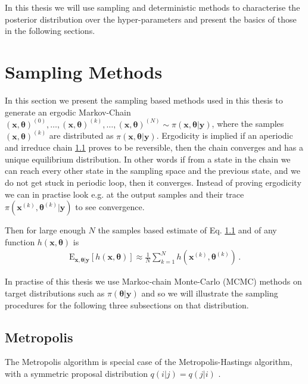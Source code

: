 In this thesis we will use sampling and deterministic methods to characterise the posterior distribution over the hyper-parameters and present the basics of those in the following sections.


\section{Sampling Methods}
In this section we present the sampling based methods used in this thesis to generate an ergodic Markov-Chain $ (\bm{x}, \bm{\theta} )^{(0)}, \dots, (\bm{x}, \bm{\theta} )^{(k)} , \dots,  (\bm{x}, \bm{\theta})^{(N)} \sim \pi(\bm{x},\bm{\theta}| \bm{y}) $, where the samples $(\bm{x}, \bm{\theta} )^{(k)}$ are distributed as $\pi(\bm{x},\bm{\theta}| \bm{y}) $.
Ergodicity is implied if an aperiodic and irreduce chain \ref{} proves to be reversible, then the chain converges and has a unique  equilibrium distribution.
In other words if from a state in the chain we can reach every other state in the sampling space and the previous state, and we do not get stuck in periodic loop, then it converges.
Instead of proving ergodicity we can in practise look e.g. at the output samples and their trace $\pi(\bm{x}^{(k)},\bm{\theta}^{(k)}| \bm{y})$ to see convergence.

Then for large enough $N$ the samples based estimate of Eq. \ref{} and of any function $h(\bm{x}, \bm{\theta})$ is
\begin{align}
	\label{eq:sampMean}
	\text{E}_{\bm{x},\bm{\theta}|\bm{y}} [h(\bm{x}, \bm{\theta})] \approx \frac{1}{N} \sum_{k=1}^{N} h(\bm{x}^{(k)},\bm{\theta}^{(k)}) \, .
\end{align}

In practise of this thesis we use Markoc-chain Monte-Carlo (MCMC) methods on target distributions such as $\pi(\bm{\theta}| \bm{y})$ and so we will illustrate the sampling procedures for the following three subsections on that distribution.

\subsection{Metropolis}

The Metropolis algorithm is special case of the Metropolis-Hastings algorithm, with a symmetric proposal distribution $q(i|j) =q(j|i) $ \cite{}.

